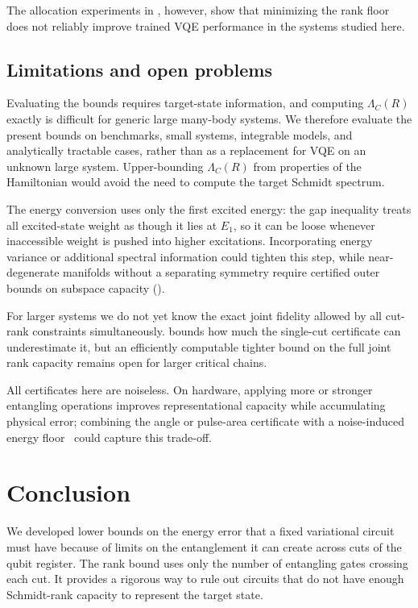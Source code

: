 \documentclass[reprint,aps,pra,floatfix,superscriptaddress,nofootinbib,longbibliography]{revtex4-2}
\theoremstyle{remark}
\theoremstyle{definition}
\begin{document}
The allocation experiments in , however, show that minimizing the rank floor does not reliably improve trained VQE
performance in the systems studied here.

\subsection{Limitations and open problems}

Evaluating the bounds requires target-state information, and computing
$\Lambda_C(R)$ exactly is difficult for generic large many-body systems. We
therefore evaluate the present bounds on benchmarks, small systems, integrable
models, and analytically tractable cases, rather than as a replacement for VQE on an unknown large system.
Upper-bounding $\Lambda_C(R)$ from properties of the Hamiltonian would avoid the
need to compute the target Schmidt spectrum.

The energy conversion uses only the first excited energy: the gap
inequality treats all excited-state weight as though it lies at $E_1$, so it can
be loose whenever inaccessible weight is pushed into higher excitations.
Incorporating energy variance or additional spectral information could tighten
this step, while near-degenerate manifolds without a separating symmetry require
certified outer bounds on subspace capacity ().

For larger systems we do not yet know the exact joint fidelity allowed by
all cut-rank constraints simultaneously.  bounds how much the
single-cut certificate can underestimate it, but an efficiently computable
tighter bound on the full joint rank capacity remains open for larger critical
chains.

All certificates here are noiseless. On hardware, applying more or
stronger entangling operations improves representational capacity while
accumulating physical error; combining the angle or pulse-area certificate with
a noise-induced energy floor~\cite{mishra2024classically} could capture this trade-off.

\section{Conclusion}
\label{sec:conclusion}

We developed lower bounds on the energy error that a fixed variational circuit
must have because of limits on the entanglement it can create across cuts of the
qubit register. The rank bound uses only the number of entangling gates
crossing each cut. It provides a rigorous way to rule out circuits that do not
have enough Schmidt-rank capacity to represent the target state.
\end{document}
